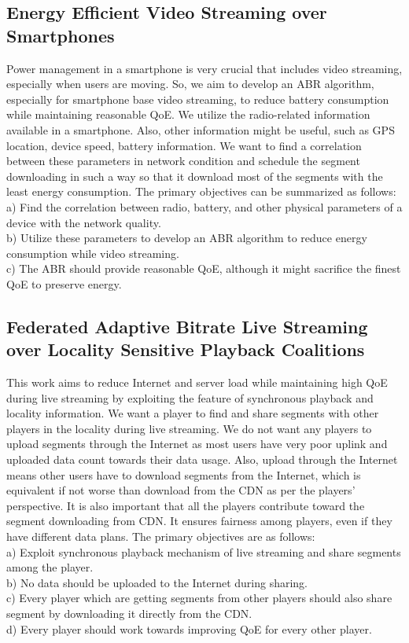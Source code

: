 \subsection{Energy Efficient Video Streaming over Smartphones}
Power management in a smartphone is very crucial that includes video streaming, especially when users are moving. So, we aim to develop an ABR algorithm, especially for smartphone base video streaming, to reduce battery consumption while maintaining reasonable QoE. We utilize the radio-related information available in a smartphone. Also, other information might be useful, such as GPS location, device speed, battery information. We want to find a correlation between these parameters in network condition and schedule the segment downloading in such a way so that it download most of the segments with the least energy consumption. The primary objectives can be summarized as follows:\\
a) Find the correlation between radio, battery, and other physical parameters of a device with the network quality.\\
b) Utilize these parameters to develop an ABR algorithm to reduce energy consumption while video streaming.\\
c) The ABR should provide reasonable QoE, although it might sacrifice the finest QoE to preserve energy.

\subsection{Federated Adaptive Bitrate Live
	Streaming over Locality Sensitive
	Playback Coalitions}
This work aims to reduce Internet and server load while maintaining high QoE during live streaming by exploiting the feature of synchronous playback and locality information. We want a player to find and share segments with other players in the locality during live streaming. We do not want any players to upload segments through the Internet as most users have very poor uplink and uploaded data count towards their data usage. Also, upload through the Internet means other users have to download segments from the Internet, which is equivalent if not worse than download from the CDN as per the players' perspective. It is also important that all the players contribute toward the segment downloading from CDN. It ensures fairness among players, even if they have different data plans. The primary objectives are as follows: \\
a) Exploit synchronous playback mechanism of live streaming and share segments among the player.\\
b) No data should be uploaded to the Internet during sharing.\\
c) Every player which are getting segments from other players should also share segment by downloading it directly from the CDN. \\
d) Every player should work towards improving QoE for every other player.